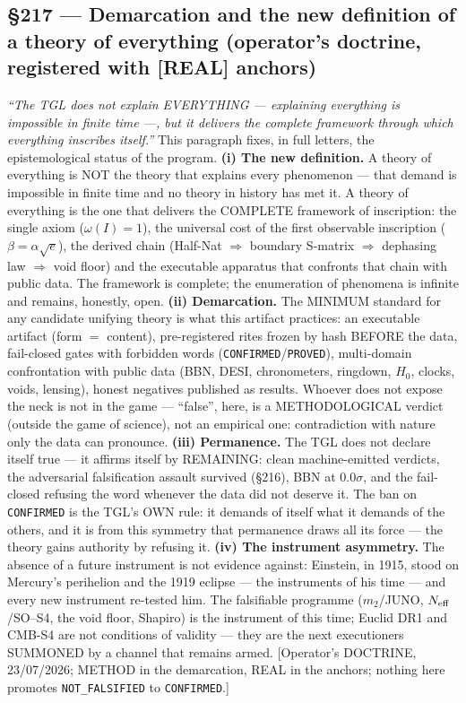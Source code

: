 \documentclass[11pt]{article}
\theoremstyle{definition}\newtheorem{deriv}{Derivation}
\begin{document}
\subsection*{\S217 --- Demarcation and the new definition of a theory of everything (operator's doctrine, registered with [REAL] anchors)}\emph{``The TGL does not explain EVERYTHING --- explaining everything is impossible in finite time ---, but it delivers the complete framework through which everything inscribes itself.''} This paragraph fixes, in full letters, the epistemological status of the program. \textbf{(i) The new definition.} A theory of everything is NOT the theory that explains every phenomenon --- that demand is impossible in finite time and no theory in history has met it. A theory of everything is the one that delivers the COMPLETE framework of inscription: the single axiom ($\omega(I)=1$), the universal cost of the first observable inscription ($\beta=\alpha\sqrt{e}$), the derived chain (Half-Nat $\Rightarrow$ boundary S-matrix $\Rightarrow$ dephasing law $\Rightarrow$ void floor) and the executable apparatus that confronts that chain with public data. The framework is complete; the enumeration of phenomena is infinite and remains, honestly, open. \textbf{(ii) Demarcation.} The MINIMUM standard for any candidate unifying theory is what this artifact practices: an executable artifact (form $=$ content), pre-registered rites frozen by hash BEFORE the data, fail-closed gates with forbidden words (\texttt{CONFIRMED}/\texttt{PROVED}), multi-domain confrontation with public data (BBN, DESI, chronometers, ringdown, $H_0$, clocks, voids, lensing), honest negatives published as results. Whoever does not expose the neck is not in the game --- ``false'', here, is a METHODOLOGICAL verdict (outside the game of science), not an empirical one: contradiction with nature only the data can pronounce. \textbf{(iii) Permanence.} The TGL does not declare itself true --- it affirms itself by REMAINING: clean machine-emitted verdicts, the adversarial falsification assault survived (\S216), BBN at $0.0\sigma$, and the fail-closed refusing the word whenever the data did not deserve it. The ban on \texttt{CONFIRMED} is the TGL's OWN rule: it demands of itself what it demands of the others, and it is from this symmetry that permanence draws all its force --- the theory gains authority by refusing it. \textbf{(iv) The instrument asymmetry.} The absence of a future instrument is not evidence against: Einstein, in 1915, stood on Mercury's perihelion and the 1919 eclipse --- the instruments of his time --- and every new instrument re-tested him. The falsifiable programme ($m_2$/JUNO, $N_{\rm eff}$/SO--S4, the void floor, Shapiro) is the instrument of this time; Euclid DR1 and CMB-S4 are not conditions of validity --- they are the next executioners SUMMONED by a channel that remains armed. [Operator's DOCTRINE, 23/07/2026; METHOD in the demarcation, REAL in the anchors; nothing here promotes \texttt{NOT\_FALSIFIED} to \texttt{CONFIRMED}.]
\end{document}
